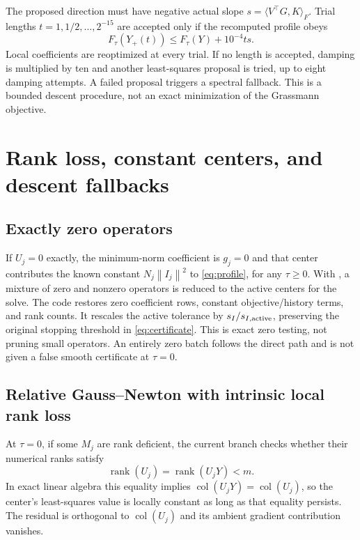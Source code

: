 \documentclass[11pt,a4paper]{article}
\newcommand{\rank}{\operatorname{rank}}
\newcommand{\col}{\operatorname{col}}
\newcommand{\norm}[1]{\left\lVert#1\right\rVert}
\newcommand{\code}[1]{\texttt{\detokenize{#1}}}
\begin{document}
The proposed direction must have negative actual slope
$s=\langle V^\top G,K\rangle_F$. Trial lengths
$t=1,1/2,\ldots,2^{-15}$ are accepted only if the recomputed profile obeys
\begin{equation}\label{eq:armijo}
 F_\tau(Y_+(t))\le F_\tau(Y)+10^{-4}t s.
\end{equation}
Local coefficients are reoptimized at every trial. If no length is accepted,
damping is multiplied by ten and another least-squares proposal is tried,
up to eight damping attempts. A failed proposal triggers a spectral fallback.
This is a bounded descent procedure, not an exact minimization of the
Grassmann objective.

\section{Rank loss, constant centers, and descent fallbacks}\label{sec:guards}
\subsection{Exactly zero operators}
If $U_j=0$ exactly, the minimum-norm coefficient is $g_j=0$ and that
center contributes the known constant $N_j\norm{I_j}^2$ to
\eqref{eq:profile}, for any $\tau\ge0$. With
\code{constant_centers=True}, a mixture of zero and nonzero operators is
reduced to the active centers for the solve. The code restores zero
coefficient rows, constant objective/history terms, and rank counts.
It rescales the active tolerance by $s_I/s_{I,\rm active}$, preserving
the original stopping threshold in \eqref{eq:certificate}. This is exact
zero testing, not pruning small operators. An entirely zero batch follows
the direct path and is not given a false smooth certificate at $\tau=0$.

\subsection{Relative Gauss--Newton with intrinsic local rank loss}
At $\tau=0$, if some $M_j$ are rank deficient, the current
\code{relative_gn=True} branch checks whether their numerical ranks satisfy
\begin{equation}\label{eq:intrinsic}
 \rank(U_j)=\rank(U_jY)<m.
\end{equation}
In exact linear algebra this equality implies
$\col(U_jY)=\col(U_j)$, so the center's least-squares value is locally
constant as long as that equality persists. The residual is orthogonal to
$\col(U_j)$ and its ambient gradient contribution vanishes.
\end{document}
